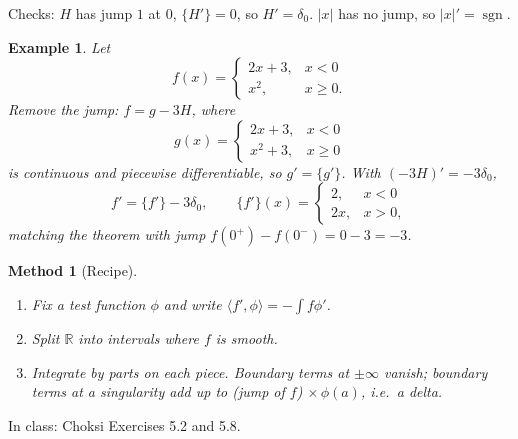\documentclass{article}
\newtheorem*{example}{Example}
\newtheorem{method}{Method}
\newcommand{\R}{\mathbb{R}}
\newcommand{\ip}[2]{\langle #1, #2 \rangle}
\begin{document}
Checks: $H$ has jump $1$ at $0$, $\{H'\} = 0$, so $H' = \delta_0$. $|x|$ has no jump, so $|x|' = \operatorname{sgn}$.
\begin{example}
    Let
    \begin{equation}
        f(x) = \begin{cases} 2x + 3, & x < 0 \\ x^2, & x \geq 0. \end{cases}
    \end{equation}
    Remove the jump: $f = g - 3H$, where
    \begin{equation}
        g(x) = \begin{cases} 2x + 3, & x < 0 \\ x^2 + 3, & x \geq 0 \end{cases}
    \end{equation}
    is continuous and piecewise differentiable, so $g' = \{g'\}$. With $(-3H)' = -3\delta_0$,
    \begin{equation}
        f' = \{f'\} - 3\delta_0, \qquad \{f'\}(x) = \begin{cases} 2, & x < 0 \\ 2x, & x > 0, \end{cases}
    \end{equation}
    matching the theorem with jump $f(0^+) - f(0^-) = 0 - 3 = -3$.
\end{example}
\begin{method}[Recipe]
    \begin{enumerate}[label=(\arabic*)]
        \item Fix a test function $\phi$ and write $\ip{f'}{\phi} = -\int f\phi'$.
        \item Split $\R$ into intervals where $f$ is smooth.
        \item Integrate by parts on each piece. Boundary terms at $\pm\infty$ vanish; boundary terms at a singularity add up to (jump of $f$) $\times\,\phi(a)$, i.e.\ a delta.
    \end{enumerate}
\end{method}
In class: Choksi Exercises 5.2 and 5.8.
\end{document}
